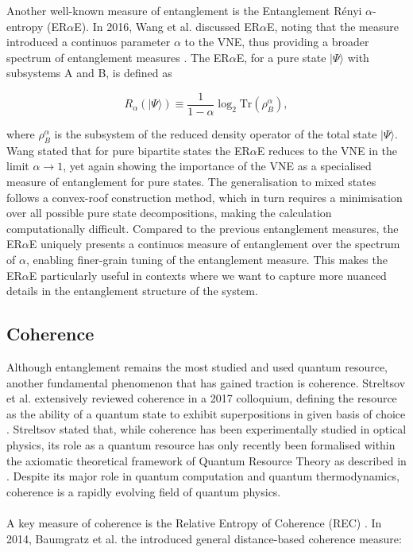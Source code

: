 \documentclass[12pt,a4paper]{article}
\begin{document}
Another well-known measure of entanglement is the Entanglement R\'enyi $\alpha$-entropy (ER$\alpha$E). In 2016, Wang et al. discussed ER$\alpha$E, noting that the measure introduced a continuos parameter $\alpha$ to the VNE, thus providing a broader spectrum of entanglement measures \cite{Entanglement2016-ERaE_Definition}. The ER$\alpha$E, for a pure state $|\Psi\rangle$ with subsystems A and B, is defined as

\begin{equation}
    R_{\alpha}(|\Psi\rangle) \equiv \frac{1}{1-\alpha}\log_2{\text{Tr}(\rho_B^\alpha)},
\end{equation}

where $\rho_B^\alpha$ is the subsystem of the reduced density operator of the total state $|\Psi\rangle$. Wang stated that for pure bipartite states the ER$\alpha$E reduces to the VNE in the limit $\alpha \rightarrow 1$, yet again showing the importance of the VNE as a specialised measure of entanglement for pure states. The generalisation to mixed states follows a convex-roof construction method, which in turn requires a minimisation over all possible pure state decompositions, making the calculation computationally difficult. Compared to the previous entanglement measures, the ER$\alpha$E uniquely presents a continuos measure of entanglement over the spectrum of $\alpha$, enabling finer-grain tuning of the entanglement measure. This makes the ER$\alpha$E particularly useful in contexts where we want to capture more nuanced details in the entanglement structure of the system. 

\subsection{Coherence}

Although entanglement remains the most studied and used quantum resource, another fundamental phenomenon that has gained traction is coherence. Streltsov et al. extensively reviewed coherence in a 2017 colloquium, defining the resource as the ability of a quantum state to exhibit superpositions in given basis of choice \cite{Coherence2017-Colloquium}. Streltsov stated that, while coherence has been experimentally studied in optical physics, its role as a quantum resource has only recently been formalised within the axiomatic theoretical framework of Quantum Resource Theory as described in \cite{CohEnt2019-QRT_def}. Despite its major role in quantum computation and quantum thermodynamics, coherence is a rapidly evolving field of quantum physics. \\
\\
A key measure of coherence is the Relative Entropy of Coherence (REC) \cite{Coherence2014-seed}. In 2014, Baumgratz et al. the introduced general distance-based coherence measure:
\end{document}
